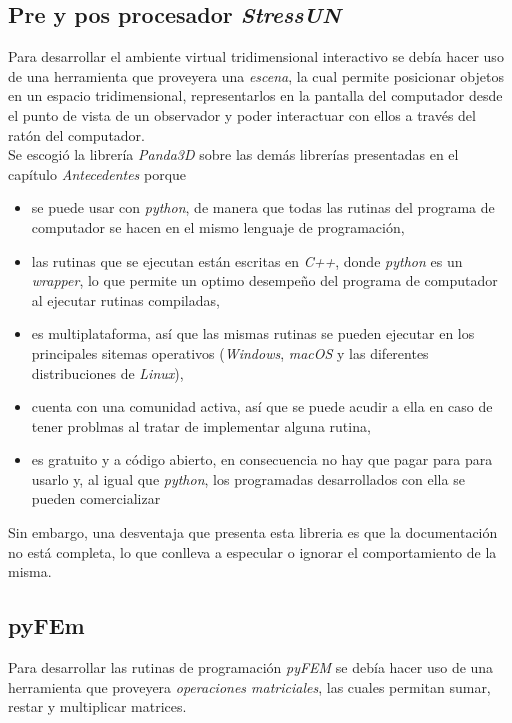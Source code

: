 \subsection{Pre y pos procesador \textit{StressUN}}

Para desarrollar el ambiente virtual tridimensional interactivo se debía hacer uso de una herramienta que proveyera una \textit{escena}, la cual permite posicionar objetos en un espacio tridimensional, representarlos en la pantalla del computador desde el punto de vista de un observador y poder interactuar con ellos a través del ratón del computador. \\

Se escogió la librería \textit{Panda3D} sobre las demás librerías presentadas en el capítulo \textit{Antecedentes} porque
\begin{itemize}
    \item se puede usar con \textit{python}, de manera que todas las rutinas del programa de computador se hacen en el mismo lenguaje de programación, 
    \item las rutinas que se ejecutan están escritas en \textit{C++}, donde \textit{python} es un \textit{wrapper}, lo que permite un optimo desempeño del programa de computador al ejecutar rutinas compiladas, 
    \item es multiplataforma, así que las mismas rutinas se pueden ejecutar en los principales sitemas operativos (\textit{Windows}, \textit{macOS} y las diferentes distribuciones de \textit{Linux}), 
    \item cuenta con una comunidad activa, así que se puede acudir a ella en caso de tener problmas al tratar de implementar alguna rutina, 
    \item es gratuito y a código abierto, en consecuencia no hay que pagar para para usarlo y, al igual que \textit{python}, los programadas desarrollados con ella se pueden comercializar
\end{itemize}

Sin embargo, una desventaja que presenta esta libreria es que la documentación no está completa, lo que conlleva a especular o ignorar el comportamiento de la misma.

\subsection{pyFEm}

Para desarrollar las rutinas de programación \textit{pyFEM} se debía hacer uso de una herramienta que proveyera \textit{operaciones matriciales}, las cuales permitan sumar, restar y multiplicar matrices. \\

